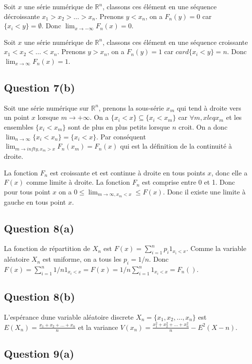 \documentclass[]{book}
\theoremstyle{definition}
\newcommand{\bb}[1]{\mathbb{#1}}
\newcommand{\R}{\bb{R}}
\begin{document}
Soit $x$ une s\'erie num\'erique de $\R^n$, classons ces \'el\'ement en une s\'equence d\'ecroissante $x_1 > x_2 > \ldots > x_n$. Prenons $y < x_n$, on a $F_n(y) = 0$ car $\{ x_i < y \} = \emptyset$. Donc $\lim_{x \to -\infty}F_n(x) = 0$.

Soit $x$ une s\'erie num\'erique de $\R^n$, classons ces \'el\'ement en une s\'equence croissante $x_1 < x_2 < \ldots < x_n$. Prenons $y > x_n$, on a $F_n(y) = 1$ car $card \{ x_i < y \} = n$. Donc $\lim_{x \to \infty}F_n(x) = 1$.

\subsection*{Question 7(b)}
Soit une s\'erie num\'erique sur $\R^n$, prenons la sous-s\'erie $x_m$ qui tend \`a droite vers un point $x$ lorsque $m \to +\infty$. On a $\{ x_i < x\} \subseteq \{x_i < x_m\}$ car $\forall m, x leq x_m$ et les ensembles $\{x_i < x_m\}$ sont de plus en plus petits lorsque $n$ croit. On a donc $\lim_{n \to \infty} \{ x_i < x_n\} = \{x_i < x\}$. Par cons\'equent $\lim_{m \to infty, x_m > x} F_n(x_m) = F_n(x)$ qui est la d\'efinition de la continuit\'e \`a droite.

La fonction $F_n$ est croissante et est continue \`a droite en tous points $x$, donc elle a $F(x)$ comme limite \`a droite. La fonction $F_n$ est comprise entre 0 et 1. Donc pour tous point $x$ on a $0 \leq \lim_{m \to \infty, x_m < x} \leq F(x)$.  Donc il existe une limite \`a gauche en tous point $x$.

\subsection*{Question 8(a)}
La fonction de r\'epartition de $X_n$ est $F(x) = \sum_{i=1}^{n} p_i 1_{x_i < x}$. Comme la variable al\'eatoire $X_n$ est uniforme, on a tous les $p_i = 1/n$. Donc $F(x) = \sum_{i=1}^{n} 1/n 1_{x_i < x} = F(x) = 1/n \sum_{i=1}^{n} 1_{x_i < x} = F_n()$.

\subsection*{Question 8(b)}
L'esp\'erance dune variable al\'eatoire discrete $X_n = \{x_1, x_2, \ldots, x_n\}$ est $E(X_n) = \frac{x_1+x_2+\ldots + x_n}{n}$ et la variance $V(x_n) = \frac{x_1^2+x_2^2+\ldots + x_n^2}{n} - E^2(X-n)$.

\subsection*{Question 9(a)}
\end{document}
